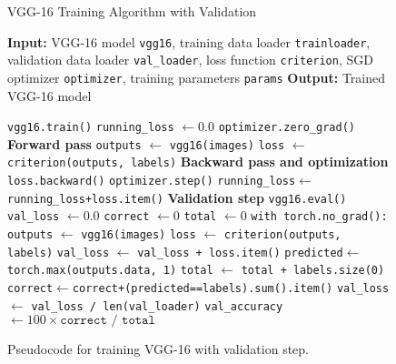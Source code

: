 \documentclass[conference]{IEEEtran}
\begin{document}
\begin{figure}[h]
\centering
\begin{minipage}{.5\textwidth}
\begin{algorithm}[H]
\caption{VGG-16 Training Algorithm with Validation}
\label{alg:vgg16_training_validation}
\begin{algorithmic}[1]
\scriptsize
\STATE \textbf{Input:} VGG-16 model \texttt{vgg16},
training data loader \texttt{trainloader},
validation data loader \texttt{val\_loader},
loss function \texttt{criterion},
SGD optimizer \texttt{optimizer},
training parameters \texttt{params}
\STATE \textbf{Output:} Trained VGG-16 model

    \STATE \texttt{vgg16.train()}
    \STATE \texttt{running\_loss} $\leftarrow 0.0$
        \STATE \texttt{optimizer.zero\_grad()}
        \STATE \textbf{Forward pass}
        \STATE \texttt{outputs} $\leftarrow$ \texttt{vgg16(images)}
        \STATE \texttt{loss} $\leftarrow$ \texttt{criterion(outputs, labels)}
        \STATE \textbf{Backward pass and optimization}
        \STATE \texttt{loss.backward()}
        \STATE \texttt{optimizer.step()}
        \STATE \texttt{running\_loss}$\leftarrow$\texttt{running\_loss+loss.item()}
    \ENDFOR
    \STATE \textbf{Validation step}
    \STATE \texttt{vgg16.eval()}
    \STATE \texttt{val\_loss} $\leftarrow 0.0$
    \STATE \texttt{correct} $\leftarrow 0$
    \STATE \texttt{total} $\leftarrow 0$
    \STATE \texttt{with torch.no\_grad():}
            \STATE \texttt{outputs} $\leftarrow$ \texttt{vgg16(images)}
            \STATE \texttt{loss} $\leftarrow$ \texttt{criterion(outputs, labels)}
            \STATE \texttt{val\_loss} $\leftarrow$ \texttt{val\_loss + loss.item()}
            \STATE \texttt{predicted}$\leftarrow$\texttt{torch.max(outputs.data, 1)}
            \STATE \texttt{total} $\leftarrow$ \texttt{total + labels.size(0)}
            \STATE \texttt{correct}$\leftarrow$\texttt{correct+(predicted==labels).sum().item()}
        \ENDFOR
    \STATE \texttt{val\_loss} $\leftarrow$ \texttt{val\_loss / len(val\_loader)}
    \STATE \texttt{val\_accuracy} $\leftarrow 100 \times \texttt{correct / total}$
\ENDFOR

\end{algorithmic}
\end{algorithm}
\end{minipage}
\caption{Pseudocode for training VGG-16 with validation step.}
\end{figure}
\end{document}
